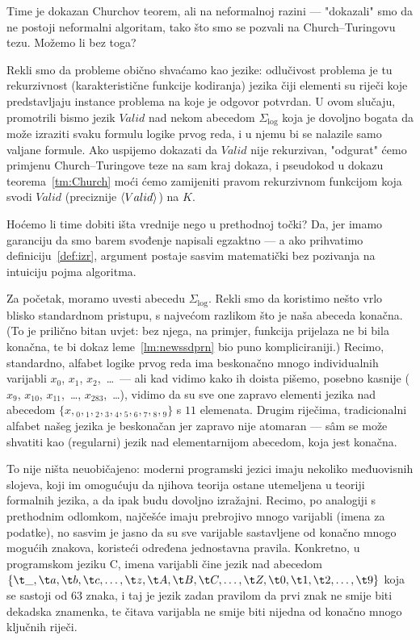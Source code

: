 Time je dokazan Churchov teorem, ali na neformalnoj razini --- "dokazali" smo da ne postoji neformalni algoritam, tako što smo se pozvali na Church--\!Turingovu tezu. Možemo li bez toga?

Rekli smo da probleme obično shvaćamo kao jezike: odlučivost problema je tu rekurzivnost (karakteristične funkcije kodiranja) jezika čiji elementi su riječi koje predstavljaju instance problema na koje je odgovor potvrdan. U ovom slučaju, promotrili bismo jezik $Valid$ nad nekom abecedom $\Sigma_{\log}$ koja je dovoljno bogata da može izraziti svaku formulu logike prvog reda, i u njemu bi se nalazile samo valjane formule. Ako uspijemo dokazati da $Valid$ nije rekurzivan, "odgurat" ćemo primjenu Church--\!Turingove teze na sam kraj dokaza, i pseudokod u dokazu teorema~\ref{tm:Church} moći ćemo zamijeniti pravom rekurzivnom funkcijom koja svodi $Valid$ (preciznije $\langle Valid\rangle$) na $K$.

Hoćemo li time dobiti išta vrednije nego u prethodnoj točki? Da, jer imamo garanciju da smo barem svođenje napisali egzaktno --- a ako prihvatimo definiciju~\ref{def:izr}, argument postaje sasvim matematički bez pozivanja na intuiciju pojma algoritma.

Za početak, moramo uvesti abecedu $\Sigma_{\log}$. Rekli smo da koristimo nešto vrlo blisko standardnom pristupu, s najvećom razlikom što je naša abeceda konačna. (To je prilično bitan uvjet: bez njega, na primjer, funkcija prijelaza ne bi bila konačna, te bi dokaz leme~\ref{lm:newssdprn} bio puno kompliciraniji.) Recimo, standardno, alfabet logike prvog reda ima beskonačno mnogo individualnih varijabli $x_0$, $x_1$, $x_2$,~\ldots\ --- ali kad vidimo kako ih doista pišemo, posebno kasnije ($x_9$, $x_{10}$, $x_{11}$,~\ldots, $x_{283}$,~\ldots), vidimo da su sve one zapravo elementi jezika nad abecedom $\{x,{}_0,{}_1,{}_2,{}_3,{}_4,{}_5,{}_6,{}_7,{}_8,{}_9\}$ s $11$ elemenata. Drugim riječima, tradicionalni alfabet našeg jezika je beskonačan jer zapravo nije atomaran --- sâm se može shvatiti kao (regularni) jezik nad elementarnijom abecedom, koja jest konačna.

To nije ništa neuobičajeno: moderni programski jezici imaju nekoliko međuovisnih slojeva, koji im omogućuju da njihova teorija ostane utemeljena u teoriji formalnih jezika, a da ipak budu dovoljno izražajni. Recimo, po analogiji s prethodnim odlomkom, najčešće imaju prebrojivo mnogo varijabli (imena za podatke), no sasvim je jasno da su sve varijable sastavljene od konačno mnogo mogućih znakova, koristeći određena jednostavna pravila. Konkretno, u programskom jeziku C, imena varijabli čine jezik nad abecedom
$\{\t\_,\t a,\t b,\t c,\dotsc,\t z,\t A,\t B,\t C,\dotsc,\t Z,\t 0,\t 1,\t 2,\dotsc,\t 9\}$ koja se sastoji od $63$ znaka, i taj je jezik zadan pravilom da prvi znak ne smije biti dekadska znamenka, te čitava varijabla ne smije biti nijedna od konačno mnogo ključnih riječi.

